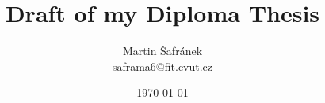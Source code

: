 \documentclass{article}
\begin{document}
\title{Draft of my Diploma Thesis}
\author{Martin Šafránek \\  \href{mailto:saframa6@fit.cvut.cz}{saframa6@fit.cvut.cz}}
\date{\today}
\maketitle
\tableofcontents
\newpage
{}


\end{document}
